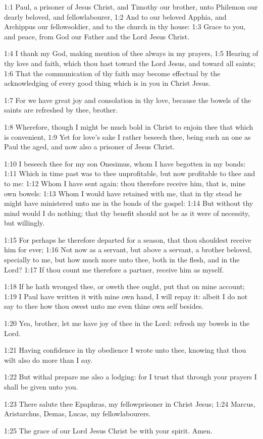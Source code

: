 

1:1 Paul, a prisoner of Jesus Christ, and Timothy our brother, unto
Philemon our dearly beloved, and fellowlabourer, 1:2 And to our
beloved Apphia, and Archippus our fellowsoldier, and to the church in
thy house: 1:3 Grace to you, and peace, from God our Father and the
Lord Jesus Christ.

1:4 I thank my God, making mention of thee always in my prayers, 1:5
Hearing of thy love and faith, which thou hast toward the Lord Jesus,
and toward all saints; 1:6 That the communication of thy faith may
become effectual by the acknowledging of every good thing which is in
you in Christ Jesus.

1:7 For we have great joy and consolation in thy love, because the
bowels of the saints are refreshed by thee, brother.

1:8 Wherefore, though I might be much bold in Christ to enjoin thee
that which is convenient, 1:9 Yet for love's sake I rather beseech
thee, being such an one as Paul the aged, and now also a prisoner of
Jesus Christ.

1:10 I beseech thee for my son Onesimus, whom I have begotten in my
bonds: 1:11 Which in time past was to thee unprofitable, but now
profitable to thee and to me: 1:12 Whom I have sent again: thou
therefore receive him, that is, mine own bowels: 1:13 Whom I would
have retained with me, that in thy stead he might have ministered unto
me in the bonds of the gospel: 1:14 But without thy mind would I do
nothing; that thy benefit should not be as it were of necessity, but
willingly.

1:15 For perhaps he therefore departed for a season, that thou
shouldest receive him for ever; 1:16 Not now as a servant, but above a
servant, a brother beloved, specially to me, but how much more unto
thee, both in the flesh, and in the Lord?  1:17 If thou count me
therefore a partner, receive him as myself.

1:18 If he hath wronged thee, or oweth thee ought, put that on mine
account; 1:19 I Paul have written it with mine own hand, I will repay
it: albeit I do not say to thee how thou owest unto me even thine own
self besides.

1:20 Yea, brother, let me have joy of thee in the Lord: refresh my
bowels in the Lord.

1:21 Having confidence in thy obedience I wrote unto thee, knowing
that thou wilt also do more than I say.

1:22 But withal prepare me also a lodging: for I trust that through
your prayers I shall be given unto you.

1:23 There salute thee Epaphras, my fellowprisoner in Christ Jesus;
1:24 Marcus, Aristarchus, Demas, Lucas, my fellowlabourers.

1:25 The grace of our Lord Jesus Christ be with your spirit. Amen.

